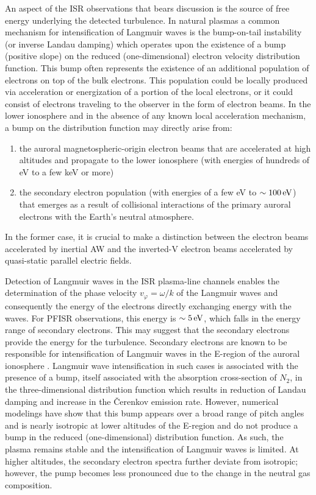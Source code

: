 An aspect of the ISR observations that bears discussion is the source of free energy underlying the detected turbulence.
In natural plasmas a common mechanism for intensification of Langmuir waves is the bump-on-tail instability (or inverse Landau damping) which operates upon the existence of a bump (positive slope) on the reduced (one-dimensional) electron velocity distribution function. 
This bump often represents the existence of an additional population of electrons on top of the bulk electrons. 
This population could be locally produced via acceleration or energization of a portion of the local electrons, or it could consist of electrons traveling to the observer in the form of electron beams. 
In the lower ionosphere and in the absence of any known local acceleration mechanism, a bump on the distribution function may directly arise from:
\begin{enumerate}
    \item the auroral magnetospheric-origin electron beams that are accelerated at high altitudes and propagate to the lower ionosphere (with energies of hundreds of eV to a few keV or more)
    \item the secondary electron population (with energies of a few eV to $\sim \unit[100]{eV}$) that emerges as a result of collisional interactions of the primary auroral electrons with the Earth's neutral atmosphere.
\end{enumerate}
In the former case, it is crucial to make a distinction between the electron beams accelerated by inertial AW and the inverted-V electron beams accelerated by quasi-static parallel electric fields. 

Detection of Langmuir waves in the ISR plasma-line channels enables the determination of the phase velocity $v_\varphi=\omega / k$ of the Langmuir waves and consequently the energy of the electrons directly exchanging energy with the waves. 
For PFISR observations, this energy is $\sim \unit[5]{eV}$, which falls in the energy range of secondary electrons. 
This may suggest that the secondary electrons provide the energy for the turbulence. 
Secondary electrons are known to be responsible for intensification of Langmuir waves in the E-region of the auroral ionosphere \citep{nilsson1996}. 
Langmuir wave intensification in such cases is associated with the presence of a bump, itself associated with the absorption cross-section of $N_2$, in the three-dimensional distribution function which results in reduction of Landau damping and increase in the Čerenkov emission rate. 
However, numerical modelings \citep{nilsson1996} have show that this bump appears over a broad range of pitch angles and is nearly isotropic at lower altitudes of the E-region and do not produce a bump in the reduced (one-dimensional) distribution function. 
As such, the plasma remains stable and the intensification of Langmuir waves is limited. 
At higher altitudes, the secondary electron spectra further deviate from isotropic; however, the pump becomes less pronounced due to the change in the neutral gas composition.

